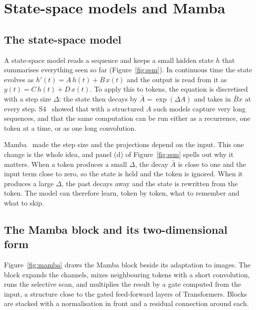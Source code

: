\chapter{State-space models and Mamba}

\section{The state-space model}

A state-space model reads a sequence and keeps a small hidden state $h$ that summarises everything seen so far
(Figure~\ref{fig:ssm}). In continuous time the state evolves as $h'(t) = A\,h(t) + B\,x(t)$ and the output is read
from it as $y(t) = C\,h(t) + D\,x(t)$. To apply this to tokens, the equation is discretised with a step size
$\Delta$: the state then decays by $\bar A = \exp(\Delta A)$ and takes in $\bar B x$ at every step. S4~\cite{gu2022s4}
showed that with a structured $A$ such models capture very long sequences, and that the same computation can be run
either as a recurrence, one token at a time, or as one long convolution.


Mamba~\cite{gu2023mamba} made the step size and the projections depend on the input. This one change is the whole
idea, and panel (d) of Figure~\ref{fig:ssm} spells out why it matters. When a token produces a small $\Delta$, the
decay $\bar A$ is close to one and the input term close to zero, so the state is held and the token is ignored.
When it produces a large $\Delta$, the past decays away and the state is rewritten from the token. The model can
therefore learn, token by token, what to remember and what to skip.

\section{The Mamba block and its two-dimensional form}

Figure~\ref{fig:mamba} draws the Mamba block beside its adaptation to images. The block expands the channels,
mixes neighbouring tokens with a short convolution, runs the selective scan, and multiplies the result by a gate
computed from the input, a structure close to the gated feed-forward layers of Transformers. Blocks are stacked
with a normalisation in front and a residual connection around each.

